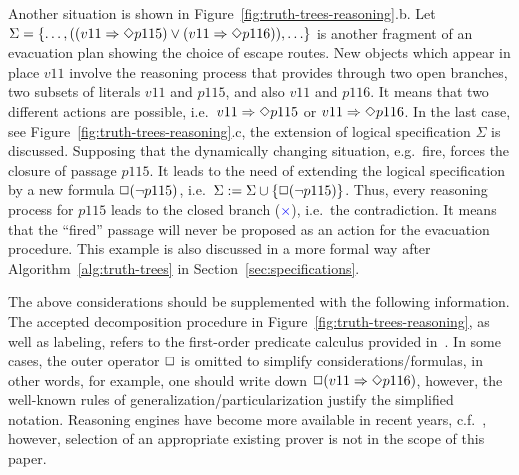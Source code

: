 \documentclass[runningheads,a4paper]{llncs}
\begin{document}
Another situation is shown in Figure~\ref{fig:truth-trees-reasoning}.b.
Let
$\Sigma=\{ \ldots, ((v11 \Rightarrow\Diamond p115) \vee (v11 \Rightarrow\Diamond p116)), \ldots\}$
is another fragment of an evacuation plan showing the choice of escape routes.
New objects which appear in place $v11$ involve the reasoning process that
provides through two open branches, two subsets of literals $v11$ and $p115$,
and also $v11$ and $p116$.
It means that two different actions are possible,
i.e.\
$v11 \Rightarrow \Diamond p115$
or
$v11 \Rightarrow \Diamond p116$.
In the last case,
see Figure~\ref{fig:truth-trees-reasoning}.c,
the extension of logical specification $\Sigma$ is discussed.
Supposing that the dynamically changing situation, e.g.\ fire, forces the closure of passage $p115$.
It leads to the need of extending the logical specification by a new formula $\Box(\neg p115)$,
i.e.\ $\Sigma := \Sigma \cup \{\Box(\neg p115)\}$.
Thus, every reasoning process for $p115$ leads to the closed branch (\textcolor{blue}{$\times$}),
i.e.\ the contradiction.
It means that the ``fired'' passage will never be proposed as an action for the evacuation procedure.
This example is also discussed in a more formal way after Algorithm~\ref{alg:truth-trees} in Section~\ref{sec:specifications}.

The above considerations should be supplemented with the following information.
The accepted decomposition procedure in Figure~\ref{fig:truth-trees-reasoning},
as well as labeling, refers to the first-order predicate calculus provided in~\cite{Hahnle-2001}.
In some cases, the outer operator $\Box$ is omitted to simplify considerations/formulas,
in other words, for example, one should write down $\Box(v11 \Rightarrow \Diamond p116)$,
however, the well-known rules of generalization/particularization justify the simplified notation.
Reasoning engines have become more available in recent years,
c.f.~\cite{Schmidt-2013-provers},
however,
selection of an appropriate existing prover is not in the scope of this paper.
\end{document}
